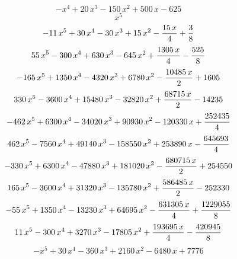 $$-x^4+20\,x^3-150\,x^2+500\,x-625$$
$$x^5$$
$$-11\,x^5+30\,x^4-30\,x^3+15\,x^2-{{15\,x}\over{4}}+{{3}\over{8}}$$
$$55\,x^5-300\,x^4+630\,x^3-645\,x^2+{{1305\,x}\over{4}}-{{525}\over{
 8}}$$
$$-165\,x^5+1350\,x^4-4320\,x^3+6780\,x^2-{{10485\,x}\over{2}}+1605$$
$$330\,x^5-3600\,x^4+15480\,x^3-32820\,x^2+{{68715\,x}\over{2}}-14235$$
$$-462\,x^5+6300\,x^4-34020\,x^3+90930\,x^2-120330\,x+{{252435}\over{
 4}}$$
$$462\,x^5-7560\,x^4+49140\,x^3-158550\,x^2+253890\,x-{{645693}\over{
 4}}$$
$$-330\,x^5+6300\,x^4-47880\,x^3+181020\,x^2-{{680715\,x}\over{2}}+
 254550$$
$$165\,x^5-3600\,x^4+31320\,x^3-135780\,x^2+{{586485\,x}\over{2}}-
 252330$$
$$-55\,x^5+1350\,x^4-13230\,x^3+64695\,x^2-{{631305\,x}\over{4}}+{{
 1229055}\over{8}}$$
$$11\,x^5-300\,x^4+3270\,x^3-17805\,x^2+{{193695\,x}\over{4}}-{{
 420945}\over{8}}$$
$$-x^5+30\,x^4-360\,x^3+2160\,x^2-6480\,x+7776$$
